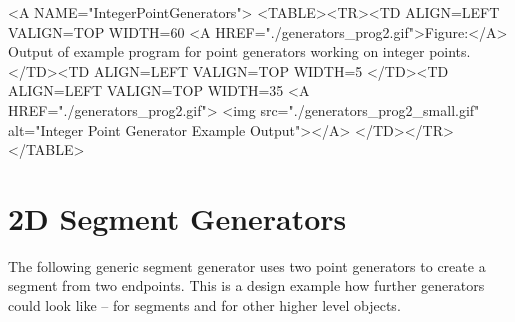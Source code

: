 
\begin{ccHtmlOnly}
  <A NAME="IntegerPointGenerators">
  <TABLE><TR><TD ALIGN=LEFT VALIGN=TOP WIDTH=60%
    <A HREF="./generators_prog2.gif">Figure:</A>
        Output of example program for point generators working
        on integer points.
  </TD><TD ALIGN=LEFT VALIGN=TOP WIDTH=5%
  </TD><TD ALIGN=LEFT VALIGN=TOP WIDTH=35%
    <A HREF="./generators_prog2.gif">
        <img src="./generators_prog2_small.gif" 
             alt="Integer Point Generator Example Output"></A>
  </TD></TR></TABLE>
\end{ccHtmlOnly}


\newpage
\section{2D Segment Generators}

The following generic segment generator uses two point generators to
create a segment from two endpoints. This is a design example how
further generators could look like -- for segments and for other
higher level objects.


